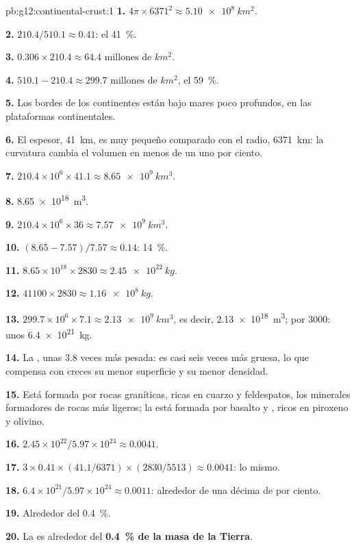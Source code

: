 \begin{solution}{pb:g12:continental-crust:1}
\textbf{1.} $4\pi \times 6371^2 \approx \qty{5.10e8}{km^2}$.

\textbf{2.} $210.4/510.1 \approx 0.41$: el \qty{41}{\percent}.

\textbf{3.} $0.306 \times 210.4 \approx \num{64.4}\text{ millones de }\unit{km^2}$.

\textbf{4.} $510.1 - 210.4 \approx \num{299.7}\text{ millones de }\unit{km^2}$,
el \qty{59}{\percent}.

\textbf{5.} Los bordes de los continentes están bajo mares poco profundos, en
las plataformas continentales.

\textbf{6.} El espesor, \qty{41}{km}, es muy pequeño comparado con el radio,
\qty{6371}{km}: la curvatura cambia el volumen en menos de un uno por
ciento.

\textbf{7.} $210.4 \times 10^6 \times 41.1 \approx \qty{8.65e9}{km^3}$.

\textbf{8.} \qty{8.65e18}{m^3}.

\textbf{9.} $210.4 \times 10^6 \times 36 \approx \qty{7.57e9}{km^3}$.

\textbf{10.} $(8.65 - 7.57)/7.57 \approx 0.14$: \qty{14}{\percent}.

\textbf{11.} $8.65 \times 10^{18} \times 2830 \approx \qty{2.45e22}{kg}$.

\textbf{12.} $41100 \times 2830 \approx \qty{1.16e8}{kg}$.

\textbf{13.} $299.7 \times 10^6 \times 7.1 \approx \qty{2.13e9}{km^3}$, es
decir, \qty{2.13e18}{m^3}; por 3000: unos \qty{6.4e21}{kg}.

\textbf{14.} La , unas 3.8 veces más pesada: es casi seis
veces más gruesa, lo que compensa con creces su menor superficie y su menor
densidad.

\textbf{15.} Está formada por rocas graníticas, ricas en cuarzo y feldespatos,
los minerales formadores de rocas más ligeros; la  está formada
por basalto y , ricos en piroxeno y olivino.

\textbf{16.} $2.45 \times 10^{22}/5.97 \times 10^{24} \approx 0.0041$.

\textbf{17.} $3 \times 0.41 \times (41.1/6371) \times (2830/5513) \approx
0.0041$: lo mismo.

\textbf{18.} $6.4 \times 10^{21}/5.97 \times 10^{24} \approx 0.0011$: alrededor
de una décima de por ciento.

\textbf{19.} Alrededor del \qty{0.4}{\percent}.

\textbf{20.} La  es alrededor del \textbf{\qty{0.4}{\percent} de la
masa de la Tierra}.
\end{solution}
